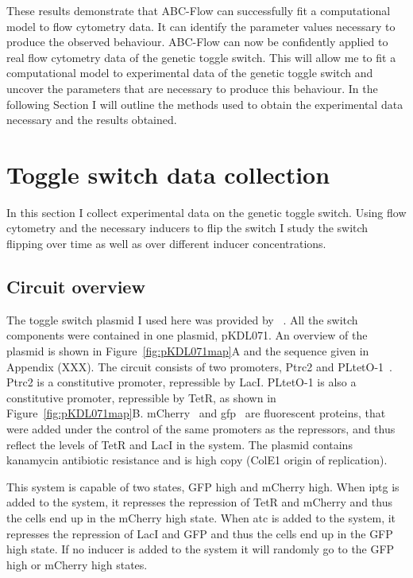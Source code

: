 These results demonstrate that ABC-Flow can successfully fit a computational model to flow cytometry data. It can identify the parameter values necessary to produce the observed behaviour. ABC-Flow can now be confidently applied to real flow cytometry data of the genetic toggle switch. This will allow me to fit a computational model to experimental data of the genetic toggle switch and uncover the parameters that are necessary to produce this behaviour. In the following Section I will outline the methods used to obtain the experimental data necessary and the results obtained.

\clearpage
\section{Toggle switch data collection}

In this section I collect experimental data on the genetic toggle switch. Using flow cytometry and the necessary inducers to flip the switch I study the switch flipping over time as well as over different inducer concentrations. 

\subsection{Circuit overview}

The toggle switch plasmid I used here was provided by ~\textcite{Litcofsky:2012gr}. All the switch components were contained in one plasmid, pKDL071. An overview of the plasmid is shown in Figure~\ref{fig:pKDL071map}A and the sequence given in Appendix (XXX). The circuit consists of two promoters, Ptrc2 and PLtetO-1~\autocite{Lutz:1997ti}. Ptrc2 is a constitutive promoter, repressible by LacI. PLtetO-1 is also a constitutive promoter, repressible by TetR, as shown in Figure~\ref{fig:pKDL071map}B. mCherry~\autocite{Shaner:2004vy} and \acrshort{gfp}~\autocite{SHIMOMURA:1962va} are fluorescent proteins, that were added under the control of the same promoters as the repressors, and thus reflect the levels of TetR and LacI in the system. The plasmid contains kanamycin antibiotic resistance and is high copy (ColE1 origin of replication).

This system is capable of two states, GFP high and mCherry high. When \acrshort{iptg} is added to the system, it represses the repression of TetR and mCherry and thus the cells end up in the mCherry high state. When \acrshort{atc} is added to the system, it represses the repression of LacI and GFP and thus the cells end up in the GFP high state. If no inducer is added to the system it will randomly go to the GFP high or mCherry high states.

